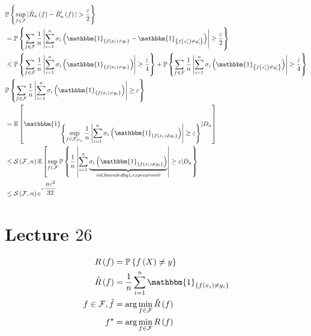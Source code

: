 \documentclass{article}
\begin{document}
\begin{align*}
&  \mathbb{P}\left\{\displaystyle\sup_{f \in \mathcal{F}} | \hat{R}_{n}\left(f\right) - \hat{R} '_{n}\left(f\right) | > \dfrac{\varepsilon}{2}\right\}
\\ &= \mathbb{P}\left\{\displaystyle\sum_{f \in \mathcal{F}} \dfrac{1}{n} \left| \displaystyle\sum_{i=1}^{n} \sigma_{i} \left(\mathbbm{1}_{\left\{f\left(x_{i}\right) \neq  y_{i}\right\}} - \mathbbm{1}_{\left\{f\left(x'_{i}\right) \neq  y'_{i}\right\}}\right) \right| \geq  \dfrac{\varepsilon}{2}\right\}
\\ &\leq  \mathbb{P}\left\{\displaystyle\sum_{f \in \mathcal{F}} \dfrac{1}{n} \left| \displaystyle\sum_{i=1}^{n} \sigma_{i} \left(\mathbbm{1}_{\left\{f\left(x_{i}\right) \neq  y_{i}\right\}}\right) \right| \geq  \dfrac{\varepsilon}{4}\right\} + \mathbb{P}\left\{\displaystyle\sum_{f \in \mathcal{F}} \dfrac{1}{n} \left| \displaystyle\sum_{i=1}^{n} \sigma_{i} \left(\mathbbm{1}_{\left\{f\left(x'_{i}\right) \neq  y'_{i}\right\}}\right) \right| \geq  \dfrac{\varepsilon}{4}\right\}
\\ &  \mathbb{P}\left\{\displaystyle\sum_{f \in \mathcal{F}} \dfrac{1}{n} \left| \displaystyle\sum_{i=1}^{n} \sigma_{i} \left(\mathbbm{1}_{\left\{f\left(x_{i}\right) \neq  y_{i}\right\}}\right) \right| \geq  \varepsilon\right\}
\\ &= \mathbb{E}\left[\mathbbm{1}_{\left\{ \displaystyle\sup_{f \in \mathcal{F}_{D_{n}}} \dfrac{1}{n} \left| \displaystyle\sum_{i=1}^{n} \sigma_{i} \left(\mathbbm{1}_{\left\{f\left(x_{i}\right) \neq  y_{i}\right\}}\right) \right| \geq  \varepsilon \right\}} | D_{n}\right]
\\ &\leq  \mathcal{S}\left(\mathcal{F}, n\right) \mathbb{E}\left[\displaystyle\sup_{f \in \mathcal{F}} \mathbb{P}\left\{\dfrac{1}{n} \left| \displaystyle\sum_{i=1}^{n} \underbrace{\sigma_{i} \left(\mathbbm{1}_{\left\{f\left(x_{i}\right) \neq  y_{i}\right\}}\right)}_{iid, bounded by 1, expecation 0} \right| \geq  \varepsilon | D_{n}\right\}\right.
\\ &\leq  \mathcal{S}\left(\mathcal{F}, n\right) e^{- \dfrac{n \varepsilon^{2}}{32}}
\end{align*}





\section{Lecture $26$} 
\begin{align*}
R\left(f\right)  &= \mathbb{P}\left\{f\left(X\right) \neq  y\right\}
\\ \hat{R}\left(f\right) &= \dfrac{1}{n} \displaystyle\sum_{i=1}^{n} \mathbbm{1}_{\left\{f\left(x_{i}\right) \neq  y_{i}\right\}}
\\ f  \in \mathcal{F}, \hat{f} &= \arg\displaystyle\min_{f \in \mathcal{F}} \hat{R}\left(f\right)
\\ f^\star  &= \arg\displaystyle\min_{f \in \mathcal{F}} R\left(f\right) 
\end{align*}
\end{document}
